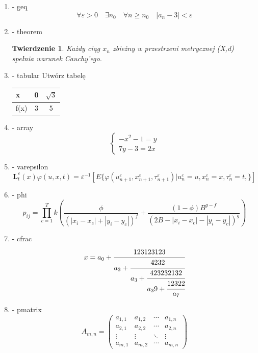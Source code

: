 \documentclass{article}
\newtheorem{theorem}{Twierdzenie}[section]
\begin{document}
\begin{enumerate}[label=\underline{Przykład \arabic{enumi}}, wide=0pt]
\item - geq
	\begin{equation*}
		\forall \varepsilon > 0 \quad \exists n_0 \quad \forall n \geq n_0 \quad |a_n - 3| < \varepsilon
	\end{equation*}

\item - theorem
	\begin{theorem}
		Każdy ciąg {$x_n$} zbieżny w przestrzeni metrycznej (X,d) spełnia warunek Cauchy'ego.
	\end{theorem}
\item - tabular
	Utwórz tabelę
	
		\begin{tabular}{|l|c|c|}
		\hline
		x    & 0 & $\sqrt{3}$ \\ \hline
		f(x) & 3 & 5       \\ \hline
		\end{tabular}

\item - array
\[
  \begin{cases}
    -x^2-1 = y \\
    7y-3=2x
  \end{cases}
\]

\item - varepsilon
\begin{equation*}
	\textbf{L}^\varepsilon_t (x)\varphi (u,x,t) =
	\varepsilon^{-1}[E\{\varphi(u^\varepsilon_{n+1},
	x^\varepsilon_{n+1},
	\tau^\varepsilon_{n+1})|
	u^\varepsilon_n = u,
	x^\varepsilon_n = x,
	\tau^\varepsilon_n = t,\}]
\end{equation*}

\item - phi
\begin{equation*}
	p_{ij} = \prod_{c=1}^T k\left( \frac{\phi}{(|x_i-x_c|+|y_i-y_c|)^f} + 
	\frac{(1 -\phi)B^{g-f}}{(2B-|x_i-x_c|-|y_i-y_c|)^g}\right)
\end{equation*}

\item - cfrac
\begin{equation}
x = a_0 + \cfrac{123123123}{
	a_3 + \cfrac{4232}{
	a_3 + \cfrac{423232132}{
	a_39 + \cfrac{12322}{a_7}}}}
\end{equation}

\item - pmatrix
\[
	A_{m,n} = 	
	\begin{pmatrix}
	a_{1,1} & a_{1,2} & \cdots & a_{1,n} \\
	a_{2,1} & a_{2,2} & \cdots & a_{2,n} \\
	\vdots & \vdots & \ddots & \vdots \\
	a_{m,1} & a_{m,2} & \cdots & a_{m,n} 
	\end{pmatrix} 
\]


\end{enumerate}
\end{document}
